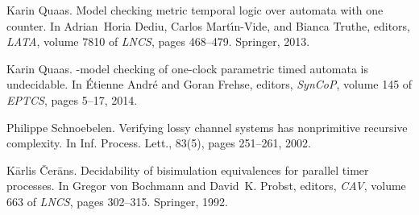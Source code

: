 \documentclass{CSML}
\theoremstyle{plain}\newtheorem{theorem}[thm]{Theorem}
\theoremstyle{plain}\newtheorem{corollary}[thm]{Corollary}
\theoremstyle{plain}\newtheorem{example}[thm]{Example}
\theoremstyle{plain}\newtheorem{lemma}[thm]{Lemma}
\theoremstyle{plain}\newtheorem{remark}[thm]{Remark}
\begin{document}
\begin{thebibliography}{Kos97}
Karin Quaas.
\newblock Model checking metric temporal logic over automata with one counter.
\newblock In Adrian~Horia Dediu, Carlos Mart\'{\i}n-Vide, and Bianca Truthe,
  editors, {\em LATA}, volume 7810 of {\em LNCS}, pages 468--479. Springer,
  2013.

Karin Quaas.
-model checking of one-clock parametric timed automata is
  undecidable.
\newblock In {\'E}tienne Andr{\'e} and Goran Frehse, editors, {\em SynCoP},
  volume 145 of {\em EPTCS}, pages 5--17, 2014.
  
  Philippe Schnoebelen.
\newblock Verifying lossy channel systems has nonprimitive recursive complexity.
\newblock In {Inf. Process. Lett.},
  83(5), pages 251--261, 2002.
  
  
  

K\={a}rlis \v{C}er\={a}ns.
\newblock Decidability of bisimulation equivalences for parallel timer
  processes.
\newblock In Gregor von Bochmann and David~K. Probst, editors, {\em CAV},
  volume 663 of {\em LNCS}, pages 302--315. Springer, 1992.


\end{thebibliography}
\end{document}
